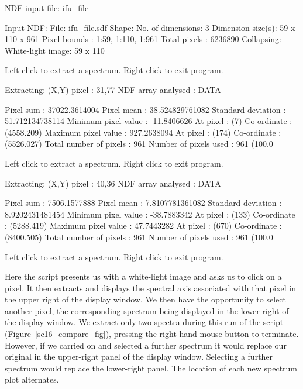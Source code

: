 \documentclass[twoside,11pt]{starlink}
\begin{document}
\begin{small}
\begin{terminalv}
  NDF input file: ifu_file

     Input NDF:
       File: ifu_file.sdf
     Shape:
       No. of dimensions: 3
       Dimension size(s): 59 x 110 x 961
       Pixel bounds     : 1:59, 1:110, 1:961
       Total pixels     : 6236890
     Collapsing:
       White-light image: 59 x 110

 Left click to extract a spectrum.
 Right click to exit program.

     Extracting:
       (X,Y) pixel             : 31,77
     NDF array analysed        : DATA

        Pixel sum              : 37022.3614004
        Pixel mean             : 38.524829761082
        Standard deviation     : 51.712134738114
        Minimum pixel value    : -11.8406626
           At pixel            : (7)
           Co-ordinate         : (4558.209)
        Maximum pixel value    : 927.2638094
           At pixel            : (174)
           Co-ordinate         : (5526.027)
        Total number of pixels : 961
        Number of pixels used  : 961 (100.0%

 Left click to extract a spectrum.
 Right click to exit program.

     Extracting:
        (X,Y) pixel            : 40,36
     NDF array analysed        : DATA

        Pixel sum              : 7506.1577888
        Pixel mean             : 7.8107781361082
        Standard deviation     : 8.9202431481454
        Minimum pixel value    : -38.7883342
           At pixel            : (133)
           Co-ordinate         : (5288.419)
        Maximum pixel value    : 47.7443282
           At pixel            : (670)
           Co-ordinate         : (8400.505)
        Total number of pixels : 961
        Number of pixels used  : 961 (100.0%


 Left click to extract a spectrum.
 Right click to exit program.
%
\end{terminalv}
\end{small}

Here the script presents us with a white-light image and asks us to
click on a pixel.  It then extracts and displays the spectral axis
associated with that pixel in the upper right of the display window.
We then have the opportunity to select another pixel, the
corresponding spectrum being displayed in the lower right of the
display window.  We extract only two spectra during this run of the
script
(Figure~\ref{sc16_compare_fig}), pressing the right-hand mouse
button to terminate.  However, if we carried on and selected a further
spectrum it would replace our original in the upper-right panel of the
display window.  Selecting a further spectrum would replace the
lower-right panel.  The location of each new spectrum plot alternates.
\end{document}
